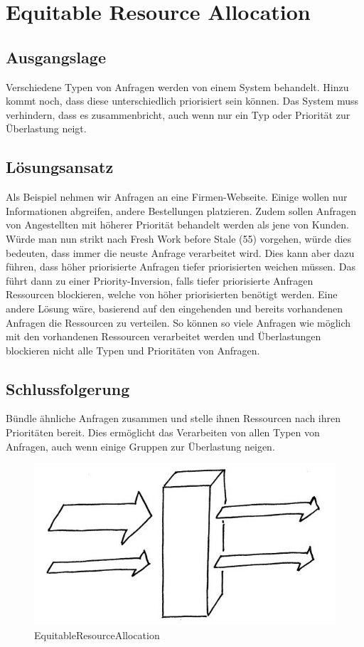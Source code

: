 \section{Equitable Resource Allocation}

\subsection{Ausgangslage}

Verschiedene Typen von Anfragen werden von einem System behandelt. Hinzu kommt noch, dass diese unterschiedlich priorisiert sein können. Das System muss verhindern, dass es zusammenbricht, auch wenn nur ein Typ oder Priorität zur Überlastung neigt.

\subsection{Lösungsansatz}

Als Beispiel nehmen wir Anfragen an eine Firmen-Webseite. Einige wollen nur Informationen abgreifen, andere Bestellungen platzieren. Zudem sollen Anfragen von Angestellten mit höherer Priorität behandelt werden als jene von Kunden.
Würde man nun strikt nach Fresh Work before Stale (55) vorgehen, würde dies bedeuten, dass immer die neuste Anfrage verarbeitet wird. Dies kann aber dazu führen, dass höher priorisierte Anfragen tiefer priorisierten weichen müssen. Das führt dann zu einer Priority-Inversion, falls tiefer priorisierte Anfragen Ressourcen blockieren, welche von höher priorisierten benötigt werden.
Eine andere Lösung wäre, basierend auf den eingehenden und bereits vorhandenen Anfragen die Ressourcen zu verteilen. So können so viele Anfragen wie möglich mit den vorhandenen Ressourcen verarbeitet werden und Überlastungen blockieren nicht alle Typen und Prioritäten von Anfragen.

\subsection{Schlussfolgerung}

Bündle ähnliche Anfragen zusammen und stelle ihnen Ressourcen nach ihren Prioritäten bereit. Dies ermöglicht das Verarbeiten von allen Typen von Anfragen, auch wenn einige Gruppen zur Überlastung neigen.

\begin{figure}[H]
	\centering
	\includegraphics[width=\textwidth]{content/faulttolerance/images/EquitableResourceAllocation.JPG}
	\caption{EquitableResourceAllocation}
\end{figure}


